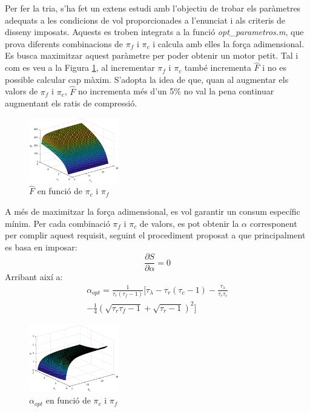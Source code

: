 \noindent Per fer la tria,  s'ha fet un extens estudi amb l'objectiu de trobar els paràmetres adequats a les condicions de vol proporcionades a l'enunciat i als criteris de disseny imposats. Aquests es troben integrats a la funció \textit{opt\_parametros.m}, que prova diferents combinacions de $\pi_f$ i $\pi_c$ i calcula amb elles la força adimensional. Es busca maximitzar aquest paràmetre per poder obtenir un motor petit. Tal i com es veu a la Figura \ref{Fadimensional}, al incrementar $\pi_f$ i $\pi_c$ també incrementa \(\hat{F}\) i no es possible calcular cap màxim. S'adopta la idea de que, quan al augmentar els valors de $\pi_f$ i $\pi_c$, \(\hat{F}\) no incrementa més d'un 5\% no val la pena continuar augmentant els ratis de compressió.
\begin{figure}[H]
	\centering
	\includegraphics[width=0.35\textwidth]{./pics/F_pc_pf}
	\caption{\(\hat{F}\) en funció de $\pi_c$ i $\pi_f$}
	\label{Fadimensional}
\end{figure}
\noindent A més de maximitzar la força adimensional, es vol garantir un consum específic mínim. Per cada combinació  $\pi_f$ i $\pi_c$ de valors, es pot obtenir la $\alpha$ corresponent per complir aquest requisit, seguint el procediment proposat a \cite[5-10]{mattingly} que principalment es basa en imposar:
\begin{equation*}
	\frac{\partial S}{\partial \alpha} = 0 
\end{equation*}
Arribant així a:
\begin{multline}
	\alpha_{opt} = \frac{1}{\tau_r(\tau_f-1)}\bigg[\tau_{\lambda}-\tau_r(\tau_c-1)-\frac{\tau_{\lambda}}{\tau_r\tau_c} \\ -\frac{1}{4}(\sqrt{\tau_r\tau_f-1} + \sqrt{\tau_r-1})^2\bigg]
\end{multline}
\begin{figure}[H]
	\centering
	\includegraphics[width=0.35\textwidth]{./pics/alpha_pc_pf}
	\caption{$\alpha_{opt}$ en funció de $\pi_c$ i $\pi_f$}
\end{figure}
